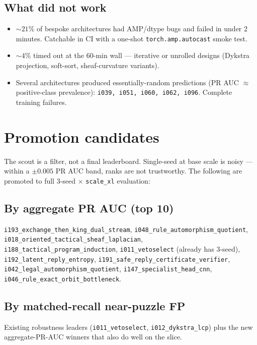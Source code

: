 \documentclass[10pt,a4paper]{article}
\begin{document}
\subsection*{What did not work}
\begin{itemize}
\item $\sim 21\%$ of bespoke architectures had AMP/dtype bugs and failed in under 2
minutes. Catchable in CI with a one-shot \texttt{torch.amp.autocast} smoke test.
\item $\sim 4\%$ timed out at the 60-min wall --- iterative or unrolled designs
(Dykstra projection, soft-sort, sheaf-curvature variants).
\item Several architectures produced essentially-random predictions (PR AUC
$\approx$ positive-class prevalence): \texttt{i039, i051, i060, i062, i096}.
Complete training failures.
\end{itemize}

\section{Promotion candidates}

The scout is a filter, not a final leaderboard. Single-seed at base scale is
noisy --- within a $\pm 0.005$ PR AUC band, ranks are not trustworthy. The
following are promoted to full 3-seed $\times$ \texttt{scale\_xl} evaluation:

\subsection*{By aggregate PR AUC (top 10)}
\texttt{i193\_exchange\_then\_king\_dual\_stream},
\texttt{i048\_rule\_automorphism\_quotient},
\texttt{i018\_oriented\_tactical\_sheaf\_laplacian},
\texttt{i188\_tactical\_program\_induction},
\texttt{i011\_vetoselect} (already has 3-seed),
\texttt{i192\_latent\_reply\_entropy},
\texttt{i191\_safe\_reply\_certificate\_verifier},
\texttt{i042\_legal\_automorphism\_quotient},
\texttt{i147\_specialist\_head\_cnn},
\texttt{i046\_rule\_exact\_orbit\_bottleneck}.

\subsection*{By matched-recall near-puzzle FP}
Existing robustness leaders (\texttt{i011\_vetoselect}, \texttt{i012\_dykstra\_lcp})
plus the new aggregate-PR-AUC winners that also do well on the slice.
\end{document}
